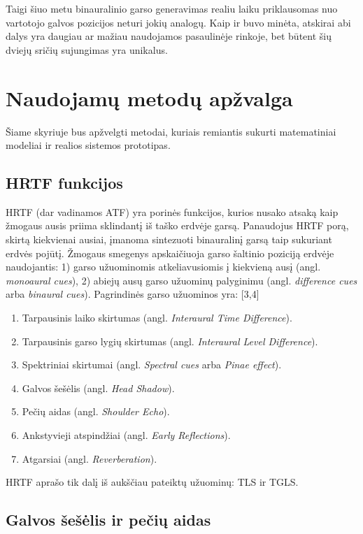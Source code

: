 \documentclass[]{vgtuef}
\begin{document}
Taigi šiuo metu binauralinio garso generavimas realiu laiku priklausomas nuo vartotojo galvos pozicijos neturi jokių analogų. Kaip ir buvo minėta, atskirai abi dalys yra daugiau ar mažiau naudojamos pasaulinėje rinkoje, bet būtent šių dviejų sričių sujungimas yra unikalus.

\section{Naudojamų metodų apžvalga}
\label{sect:naudojami_metodai}

Šiame skyriuje bus apžvelgti metodai, kuriais remiantis sukurti matematiniai modeliai ir realios sistemos prototipas.

\subsection{HRTF funkcijos}

HRTF (dar vadinamos ATF) yra porinės funkcijos, kurios nusako atsaką kaip žmogaus ausis priima sklindantį iš taško erdvėje garsą. Panaudojus HRTF porą, skirtą kiekvienai ausiai, įmanoma sintezuoti binauralinį garsą taip sukuriant erdvės pojūtį.  
Žmogaus smegenys apskaičiuoja garso šaltinio poziciją erdvėje naudojantis: 1) garso užuominomis atkeliavusiomis į kiekvieną ausį (angl. \textit{monoaural cues}), 2) abiejų ausų garso užuominų palyginimu (angl. \textit{difference cues} arba \textit{binaural cues}). Pagrindinės garso užuominos yra: [3,4]
\begin{enumerate}
\item Tarpausinis laiko skirtumas (angl. \textit{Interaural Time Difference}).
\item Tarpausinis garso lygių skirtumas (angl. \textit{Interaural Level Difference}).
\item Spektriniai skirtumai (angl. \textit{Spectral cues} arba \textit{Pinae effect}).
\item Galvos šešėlis (angl. \textit{Head Shadow}).
\item Pečių aidas (angl. \textit{Shoulder Echo}).
\item Ankstyvieji atspindžiai (angl. \textit{Early Reflections}).
\item Atgarsiai (angl. \textit{Reverberation}).
\end{enumerate}

\noindent
HRTF aprašo tik dalį iš aukščiau pateiktų užuominų: TLS ir TGLS.


\subsection{Galvos šešėlis ir pečių aidas}
\end{document}
